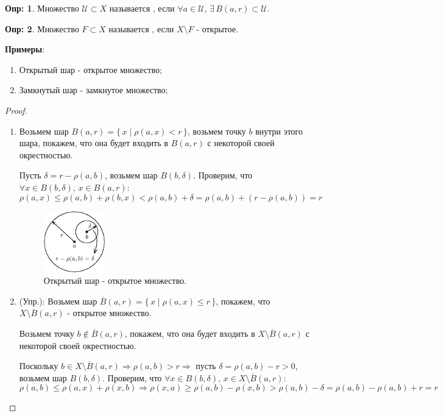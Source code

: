 \documentclass[12pt]{article}
\newcommand{\MU}{\mathcal{U}}
\theoremstyle{definition}
\newtheorem{defn}{Опр:}
\begin{document}
\begin{defn}
	Множество $\MU \subset X$ называется , если $\forall a \in \MU, \, \exists \, B(a,r) \subset \MU$.
\end{defn}
\begin{defn}
	Множество $F \subset X$ называется , если $X \setminus F$ - открытое.
\end{defn}

\textbf{Примеры}:\hfill
\begin{enumerate}[label ={(\arabic*)}]
	\item Открытый шар - открытое множество;
	\item Замкнутый шар - замкнутое множество;
\end{enumerate}
\begin{proof}\hfill
	\begin{enumerate}[label ={(\arabic*)}]
		\item Возьмем шар $B(a,r) = \{\,x \mid \rho(a,x) < r \,\}$, возьмем точку $b$ внутри этого шара, покажем, что она будет входить в $B(a,r)$ с некоторой своей окрестностью. 
		
		Пусть $\delta = r - \rho(a,b)$, возьмем шар $B(b,\delta)$. Проверим, что $\forall x \in B(b,\delta), \, x \in B(a,r)$:
		$$
			\rho(a,x) \leq \rho(a,b) + \rho(b,x) < \rho (a,b) + \delta = \rho(a,b) + (r - \rho(a,b)) = r
		$$
		\begin{figure}[H]
			\centering
			\includegraphics[width=0.25\textwidth]{7_1.eps}
			\caption{Открытый шар - открытое множество.}
			\label{7_1}
		\end{figure}
		\item (Упр.): Возьмем шар $\overline{B}(a,r) = \{\,x \mid \rho(a,x) \leq r \,\}$, покажем, что $X \setminus \overline{B}(a,r)$ - открытое множество. 
		
		Возьмем точку $b \notin \overline{B}(a,r)$, покажем, что она будет входить в $X \setminus\overline{B}(a,r)$ с некоторой своей окрестностью. 
		
		Поскольку $b \in X \setminus\overline{B}(a,r) \Rightarrow \rho(a,b) > r \Rightarrow$ пусть $\delta = \rho(a,b) - r > 0$, возьмем шар $B(b,\delta)$. Проверим, что $\forall x \in B(b,\delta), \, x \in X \setminus\overline{B}(a,r)$:
		$$
			\rho(a,b) \leq \rho(a,x) + \rho(x,b) \Rightarrow \rho(x,a) \geq \rho(a,b) - \rho(x,b) > \rho(a,b) - \delta = \rho(a,b) - \rho(a,b) + r = r
		$$
	\end{enumerate}
\end{proof}
\end{document}
